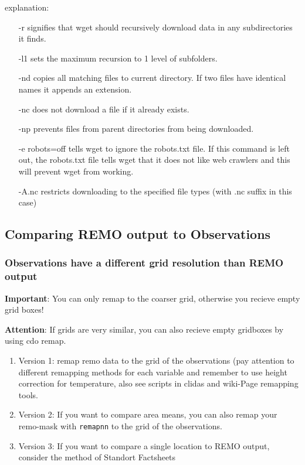 explanation:
\begin{itemize}
\item[-r] signifies that wget should recursively download data in any subdirectories it finds.
\item[-l1] sets the maximum recursion to 1 level of subfolders.
\item[-nd] copies all matching files to current directory. If two files have identical names it appends an extension.
\item[-nc] does not download a file if it already exists.
\item[-np] prevents files from parent directories from being downloaded.
\item[-e robots=off] tells wget to ignore the robots.txt file. If this command is left out, the robots.txt file tells wget that it does not like web crawlers and this will prevent wget from working.
\item[-A.nc] restricts downloading to the specified file types (with .nc suffix in this case)
\end{itemize}

\subsection{Comparing REMO output to Observations}

\subsubsection{Observations have a different grid resolution than REMO output}

\textbf{Important}: You can only remap to the coarser grid, otherwise you recieve empty grid boxes!

\textbf{Attention}: If grids are very similar, you can also recieve empty gridboxes by using cdo remap.
\begin{enumerate}
\item Version 1: remap remo data to the grid of the observations (pay attention to different remapping
methods for each variable and remember to use height correction for temperature,
also see scripts in clidas and wiki-Page remapping tools.

\item Version 2: If you want to compare area means, you can also remap your remo-mask with \texttt{remapnn} to the grid of the observations.

\item Version 3: If you want to compare a single location to REMO output, consider the method of Standort Factsheets 
\end{enumerate}

